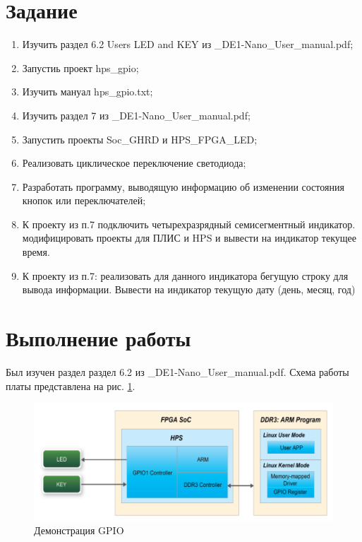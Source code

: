 \documentclass[a4paper,14pt]{article}
\begin{document}
	
	\tableofcontents
	\pagebreak
	\section{Задание}
	
	\begin{enumerate}
		
		\item Изучить раздел 6.2 Users LED and KEY из \_DE1-Nano\_User\_manual.pdf;
		
		\item Запустиь проект hps\_gpio;
		
		\item Изучить мануал hps\_gpio.txt;
		
		\item Изучить раздел 7 из \_DE1-Nano\_User\_manual.pdf;
		
		\item Запустить проекты Soc\_GHRD и HPS\_FPGA\_LED;
		
		\item Реализовать циклическое переключение светодиода;
		
		\item Разработать программу, выводящую информацию об изменении состояния кнопок или переключателей;
		
		\item К проекту из п.7 подключить четырехразрядный семисегментный индикатор. модифицировать проекты для ПЛИС и HPS и вывести на индикатор текущее время.
		
		\item К проекту из п.7: реализовать для данного индикатора бегущую строку для вывода информации. Вывести на индикатор текущую дату (день, месяц, год)
		
	\end{enumerate}
	\pagebreak
	
	\section{Выполнение работы}
	
	Был изучен раздел раздел 6.2 из \_DE1-Nano\_User\_manual.pdf. Схема работы платы представлена на 	рис. \ref{fig:gpiodemonstrtion}.
	
	\begin{figure}[H]
		\centering
		\includegraphics[width=0.7\linewidth]{images/gpio_demonstrtion}
		\caption{Демонстрация GPIO}
		\label{fig:gpiodemonstrtion}
	\end{figure}
\end{document}
